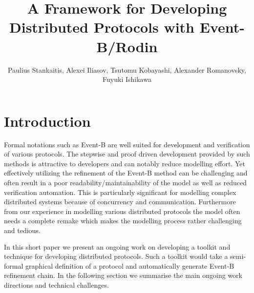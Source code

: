 \documentclass{llncs}
\begin{document}
	
	\title{A Framework for Developing Distributed Protocols with Event-B/Rodin}
	
	\author{Paulius Stankaitis, Alexei Iliasov, Tsutomu Kobayashi, Alexander Romanovsky, Fuyuki Ishikawa}
	
	\maketitle
	
\setcounter{footnote}{0}
	
	\section{Introduction}
	
	Formal notations such as Event-B \cite{EventBBook} are well suited for development and verification of various protocols. The stepwise and proof driven development provided by such methods is attractive to developers and can notably reduce modelling effort. Yet effectively utilizing the refinement of the Event-B method can be challenging and often result in a poor readability/maintainability of the model as well as reduced verification automation. This is particularly significant for modelling complex distributed systems because of concurrency and communication. Furthermore from our experience in modelling various distributed protocols the model often needs a complete remake which makes the modelling process rather challenging and tedious.
	

	
In this short paper we present an ongoing work on developing a toolkit and technique for developing distributed protocols. Such a toolkit would take a semi-formal graphical definition of a protocol and automatically generate Event-B refinement chain. In the following section we summarise the main ongoing work directions and technical challenges.
	
	 
	
	
	
\end{document}
